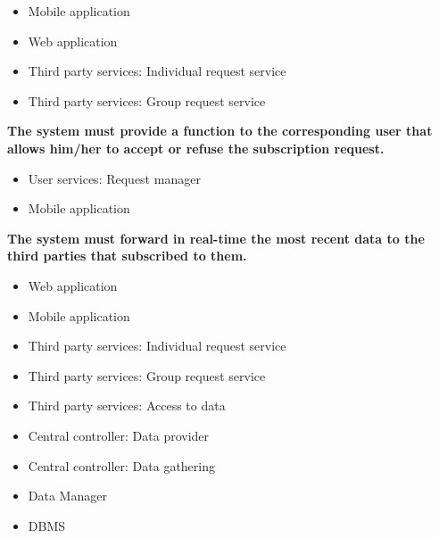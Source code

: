\begin{enumerate} [label={\bf[R\arabic*]}]
        \begin{itemize}
            \item Mobile application
            \item Web application
            \item Third party services: Individual request service
            \item Third party services: Group request service
        \end{itemize}
    \item \textbf{The system must provide a function to the corresponding user that allows him/her to accept or refuse the subscription request.}
        \begin{itemize}
            \item User services: Request manager
            \item Mobile application
        \end{itemize}
    \item \textbf{The system must forward in real-time the most recent data to the third parties that subscribed to them.}   
        \begin{itemize}
            \item Web application
            \item Mobile application
            \item Third party services: Individual request service
            \item Third party services: Group request service
            \item Third party services: Access to data
            \item Central controller: Data provider
            \item Central controller: Data gathering
            \item Data Manager
            \item DBMS
        \end{itemize}
\end{enumerate}

